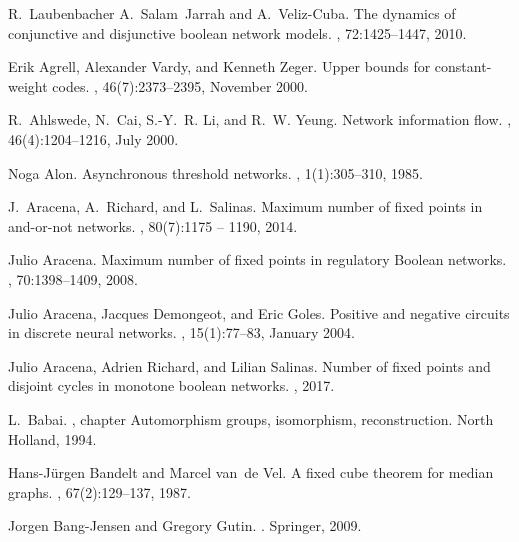 \documentclass[a4paper, 11pt]{book}
\numberwithin{equation}{section}
\theoremstyle{plain}
\renewcommand{\(}{\ldbrack}
\renewcommand{\)}{\rdbrack}
\begin{document}
%
%


\begin{thebibliography}{100}

R.~Laubenbacher A.~Salam~Jarrah and A.~Veliz-Cuba.
\newblock The dynamics of conjunctive and disjunctive boolean network models.
, 72:1425--1447, 2010.



Erik Agrell, Alexander Vardy, and Kenneth Zeger.
\newblock Upper bounds for constant-weight codes.
, 46(7):2373--2395,
  November 2000.

R.~Ahlswede, N.~Cai, S.-Y.~R. Li, and R.~W. Yeung.
\newblock Network information flow.
, 46(4):1204--1216, July
  2000.

Noga Alon.
\newblock Asynchronous threshold networks.
, 1(1):305--310, 1985.

J.~Aracena, A.~Richard, and L.~Salinas.
\newblock Maximum number of fixed points in and-or-not networks.
, 80(7):1175 -- 1190,
  2014.

Julio Aracena.
\newblock Maximum number of fixed points in regulatory {B}oolean networks.
, 70:1398--1409, 2008.

Julio Aracena, Jacques Demongeot, and Eric Goles.
\newblock Positive and negative circuits in discrete neural networks.
, 15(1):77--83, January
  2004.

Julio Aracena, Adrien Richard, and Lilian Salinas.
\newblock Number of fixed points and disjoint cycles in monotone boolean
  networks.
, 2017.

L.~Babai.
, chapter Automorphism groups,
  isomorphism, reconstruction.
\newblock North Holland, 1994.

Hans-J{\"u}rgen Bandelt and Marcel van~de Vel.
\newblock A fixed cube theorem for median graphs.
, 67(2):129--137, 1987.

Jorgen Bang-Jensen and Gregory Gutin.
.
\newblock Springer, 2009.


\end{thebibliography}
\end{document}
